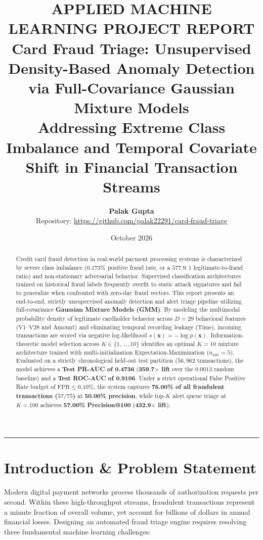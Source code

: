 \documentclass[11pt, a4paper]{article}
\title{
    \vspace{-1.2cm}
    {\Large \textbf{\textcolor{primaryblue}{APPLIED MACHINE LEARNING PROJECT REPORT}}}\\[0.4cm]
    {\LARGE \textbf{Card Fraud Triage: Unsupervised Density-Based Anomaly Detection via Full-Covariance Gaussian Mixture Models}}\\[0.3cm]
    {\large Addressing Extreme Class Imbalance and Temporal Covariate Shift in Financial Transaction Streams}
}
\author{
    \textbf{Palak Gupta}\\
    Repository: \url{https://github.com/palak22291/card-fraud-triage}
}
\date{October 2026}
\begin{document}
\maketitle
\thispagestyle{empty}

\begin{abstract}
\noindent
Credit card fraud detection in real-world payment processing systems is characterized by severe class imbalance ($0.173\%$ positive fraud rate, or a $577.9 : 1$ legitimate-to-fraud ratio) and non-stationary adversarial behavior. Supervised classification architectures trained on historical fraud labels frequently overfit to static attack signatures and fail to generalize when confronted with zero-day fraud vectors. This report presents an end-to-end, strictly unsupervised anomaly detection and alert triage pipeline utilizing full-covariance \textbf{Gaussian Mixture Models (GMM)}. By modeling the multimodal probability density of legitimate cardholder behavior across $D = 29$ behavioral features ($\text{V1}$--$\text{V28}$ and $\text{Amount}$) and eliminating temporal recording leakage ($\text{Time}$), incoming transactions are scored via negative log-likelihood $s(\mathbf{x}) = -\log p(\mathbf{x})$. Information-theoretic model selection across $K \in \{1, \dots, 10\}$ identifies an optimal $K = 10$ mixture architecture trained with multi-initialization Expectation-Maximization ($n_{\text{init}} = 5$). Evaluated on a strictly chronological held-out test partition ($56,962$ transactions), the model achieves a \textbf{Test PR-AUC of 0.4736} (\textbf{359.7$\times$ lift} over the $0.0013$ random baseline) and a \textbf{Test ROC-AUC of 0.9106}. Under a strict operational False Positive Rate budget of $\text{FPR} \le 0.10\%$, the system captures \textbf{76.00\% of all fraudulent transactions ($57 / 75$)} at \textbf{50.00\% precision}, while top-$K$ alert queue triage at $K = 100$ achieves \textbf{57.00\% Precision@100} (\textbf{432.9$\times$ lift}).
\end{abstract}

\vspace{0.3cm}
\hrule
\vspace{0.4cm}

\section{Introduction \& Problem Statement}

Modern digital payment networks process thousands of authorization requests per second. Within these high-throughput streams, fraudulent transactions represent a minute fraction of overall volume, yet account for billions of dollars in annual financial losses. Designing an automated fraud triage engine requires resolving three fundamental machine learning challenges:
\end{document}
